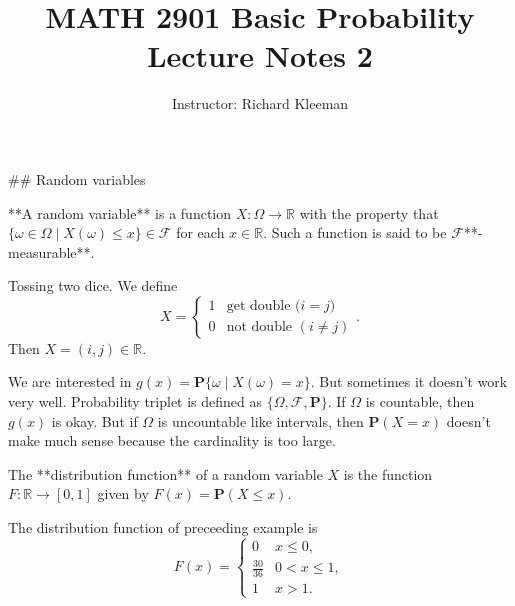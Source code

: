 


\title{MATH 2901 Basic Probability Lecture Notes 2}
\author{Instructor: Richard Kleeman}
\date{}
\maketitle


## Random variables
\begin{definition}
**A random variable** is a function $X: \Omega \to \mathbb{R}$ with the property that $\{ \omega\in \Omega \;\vert\; X(\omega) \leq x\} \in \mathcal{F}$ for each $x \in \mathbb{R}$. Such a function is said to be $\mathbf{\mathcal{F}}$**-measurable**. 
\end{definition}

\begin{example}
Tossing two dice. We define 
\begin{equation*}
    X = \begin{cases} 1 & \text{get double ($i=j$)} \\ 0 & \text{not double $(i\neq j)$} \end{cases}.
\end{equation*}
Then $X = (i,j) \in \mathbb{R}$.
\end{example}

\begin{remark}
We are interested in $g(x) = \mathbf{P}\{ \omega \;\vert\; X(\omega) = x \}$. But sometimes it doesn't work very well. Probability triplet is defined as $\{ \Omega, \mathcal{F}, \mathbf{P} \}$. If $\Omega$ is countable, then $g(x)$ is okay. But if $\Omega$ is uncountable like intervals, then $\mathbf{P}(X=x)$ doesn't make much sense because the cardinality is too large.
\end{remark}

\begin{definition}
The **distribution function** of a random variable $X$ is the function $F: \mathbb{R} \to 
[0, 1]$ given by $F(x) = \mathbf{P}(X \leq x)$. 
\end{definition}

\begin{example}
The distribution function of preceeding example is 
\begin{equation*}
    F(x) = \begin{cases} 0 & x \leq 0, \\ \frac{30}{36} & 0 < x \leq 1, \\ 1 & x > 1. \end{cases}
\end{equation*}
\end{example}

